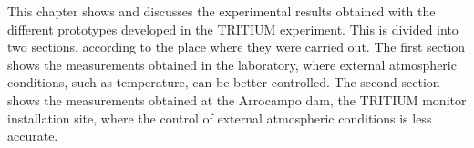 This chapter shows and discusses the experimental results obtained with the different prototypes developed in the TRITIUM experiment. This is divided into two sections, according to the place where they were carried out. The first section shows the measurements obtained in the laboratory, where external atmospheric conditions, such as temperature, can be better controlled. The second section shows the measurements obtained at the Arrocampo dam, the TRITIUM monitor installation site, where the control of external atmospheric conditions is less accurate.


